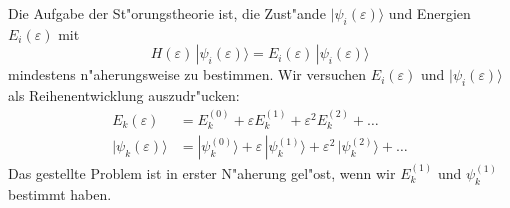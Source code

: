 Die Aufgabe der St"orungstheorie ist, die Zust"ande
$|\psi_i(\varepsilon)\rangle$
und Energien $E_i(\varepsilon)$ mit
\[
H(\varepsilon)\,|\psi_i(\varepsilon)\rangle
=
E_i(\varepsilon)\,|\psi_i(\varepsilon)\rangle
\]
mindestens n"aherungsweise zu bestimmen.
Wir versuchen $E_i(\varepsilon)$ und $|\psi_i(\varepsilon)\rangle$ als
Reihenentwicklung auszudr"ucken:
\begin{align*}
E_k(\varepsilon)
&=
E_k^{(0)}+\varepsilon E_k^{(1)} + \varepsilon^2 E_k^{(2)}+\dots
\\
|\psi_k(\varepsilon)\rangle
&=
|\psi_k^{(0)}\rangle+\varepsilon\,|\psi_k^{(1)}\rangle
+\varepsilon^2\,|\psi_k^{(2)}\rangle+\dots
\end{align*}
Das gestellte Problem ist in erster N"aherung gel"ost, wenn wir $E_k^{(1)}$
und $\psi_k^{(1)}$ bestimmt haben.


